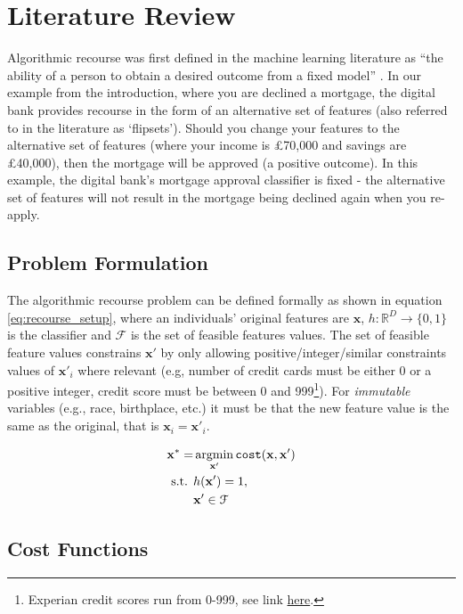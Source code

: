 \chapter{Literature Review} \label{chapter:lit_review}

Algorithmic recourse was first defined in the machine learning literature as ``the ability of a person to obtain a desired outcome from a fixed model'' \citep{ustunActionableRecourseLinear2019}. In our example from the introduction, where you are declined a mortgage, the digital bank provides recourse in the form of an alternative set of features (also referred to in the literature as `flipsets'). Should you change your features to the alternative set of features (where your income is £70,000 and savings are £40,000), then the mortgage will be approved (a positive outcome). In this example, the digital bank's mortgage approval classifier is fixed - the alternative set of features will not result in the mortgage being declined again when you re-apply.


\section{Problem Formulation}
The algorithmic recourse problem can be defined formally as shown in equation \ref{eq:recourse_setup}, where an individuals' original features are $\mathbf{x}$, $h: \mathbb{R}^D \to \{0,1\}$ is the classifier and $\mathcal{F}$ is the set of feasible features values. The set of feasible feature values constrains $\mathbf{x}'$ by only allowing positive/integer/similar constraints values of $\mathbf{x}'_i$ where relevant (e.g, number of credit cards must be either 0 or a positive integer, credit score must be between 0 and 999\footnote{Experian credit scores run from 0-999, see link \href{https://www.experian.co.uk/consumer/experian-credit-score.html}{here}.}). For \textit{immutable} variables (e.g., race, birthplace, etc.) it must be that the new feature value is the same as the original, that is $\mathbf{x}_i=\mathbf{x}'_i$.

\begin{align} \label{eq:recourse_setup}
	\mathbf{x}^* = & \operatorname*{argmin}_{\mathbf{x}'}  \operatorname*{\texttt{cost}}(\mathbf{x}, \mathbf{x}') \\ \nonumber
	\text{s.t. } & h(\mathbf{x}') = 1, \\ \nonumber
	& \mathbf{x}' \in \mathcal{F}
\end{align}

\section{Cost Functions} \label{section:cost_functions_lit_review}

